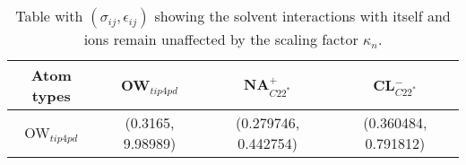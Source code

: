 \begin{table}[h!]
    \centering
    \caption{Table with $(\sigma_{ij}, \epsilon_{ij})$ showing the solvent interactions with itself and ions remain unaffected by the scaling factor $\kappa_{n}$.}
    \begin{tabular}{c | c c c }

    Atom types & OW$_{tip4pd}$ & NA$^{+}_{C22^{*}}$ & CL$^{-}_{C22^{*}}$ \\
    \hline
    OW$_{tip4pd}$ & (0.3165, 9.98989) & (0.279746, 0.442754)  & (0.360484, 0.791812)\\
    
    \hline
    \end{tabular}
    
    \label{tab:eps_noscale_table}
\end{table}